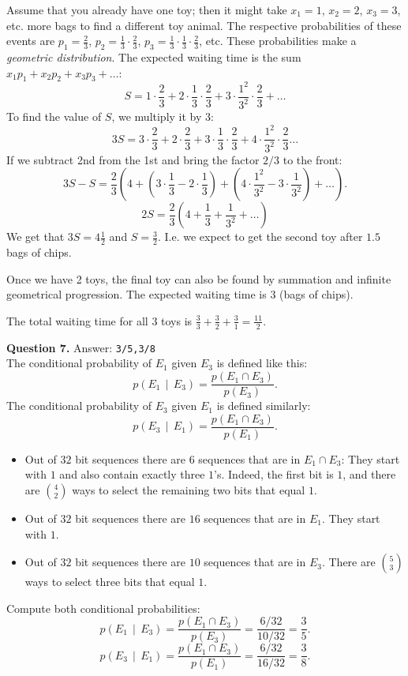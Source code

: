 \documentclass[jou]{apa6}
\begin{document}
Assume that you already have one toy; then it might take $x_1 = 1$, 
$x_2 = 2$, $x_3 = 3$, etc. more bags to find a different toy animal. 
The respective probabilities of these events are $p_1 = \frac{2}{3}$, 
$p_2 = \frac{1}{3}\cdot\frac{2}{3}$, $p_3 = \frac{1}{3}\cdot\frac{1}{3}\cdot\frac{2}{3}$, etc.
These probabilities make a {\em geometric distribution}. 
The expected waiting time is the sum $x_1p_1 + x_2p_2 + x_3p_3 + \ldots$: 
$$S = 1 \cdot \frac{2}{3} + 2 \cdot \frac{1}{3} \cdot \frac{2}{3} + 3 \cdot \frac{1^2}{3^2} \cdot \frac{2}{3} + \ldots$$
To find the value of $S$, we multiply it by $3$: 
$$3S = 3 \cdot \frac{2}{3} + 2 \cdot \frac{2}{3} + 3 \cdot \frac{1}{3} \cdot \frac{2}{3} + 4 \cdot \frac{1^2}{3^2} \cdot \frac{2}{3}\ldots$$
If we subtract 2nd from the 1st and bring the factor $2/3$ to the front: 
$$3S - S = \frac{2}{3} \left( 4  + \left(3 \cdot \frac{1}{3} - 2 \cdot \frac{1}{3} \right)
+  \left(4 \cdot \frac{1^2}{3^2} - 3 \cdot \frac{1}{3^2} \right) + \ldots \right).$$
$$2S = \frac{2}{3} \left( 4 + \frac{1}{3} + \frac{1}{3^2} + \ldots \right)$$
We get that $3S = 4\frac{1}{2}$ and $S = \frac{3}{2}$. I.e. we expect to get the
second toy after $1.5$ bags of chips.

Once we have 2 toys, the final toy can also be found by summation and infinite
geometrical progression. The expected waiting time is $3$ (bags of chips). 

The total waiting time for all $3$ toys is $\frac{3}{3} + \frac{3}{2} + \frac{3}{1} = \frac{11}{2}$.


\vspace{10pt}
{\bf Question 7.} Answer: {\tt 3/5,3/8}\\
The conditional probability of $E_1$ given $E_3$ is defined like this:
$$p(E_1 \,\mid\, E_3) = \frac{p(E_1 \cap E_3)}{p(E_3)}.$$
The conditional probability of $E_3$ given $E_1$ is defined similarly:
$$p(E_3 \,\mid\, E_1) = \frac{p(E_1 \cap E_3)}{p(E_1)}.$$

\begin{itemize}
\item Out of $32$ bit sequences there are $6$ sequences that
are in $E_1 \cap E_3$: They start with $1$ and also contain exactly three $1$'s. 
Indeed, the first bit is $1$, and there are ${4 \choose 2}$ 
ways to select the remaining two bits that equal $1$. 
\item Out of $32$ bit sequences there are $16$ sequences that 
are in $E_1$. They start with $1$.
\item Out of $32$ bit sequences there are $10$ sequences that 
are in $E_3$. There are ${5 \choose 3}$ ways to select 
three bits that equal $1$.
\end{itemize}

Compute both conditional probabilities:
$$p(E_1 \,\mid\, E_3) = \frac{p(E_1 \cap E_3)}{p(E_3)} = \frac{6/32}{10/32} = \frac{3}{5}.$$
$$p(E_3 \,\mid\, E_1) = \frac{p(E_1 \cap E_3)}{p(E_1)} = \frac{6/32}{16/32} = \frac{3}{8}.$$
\end{document}
